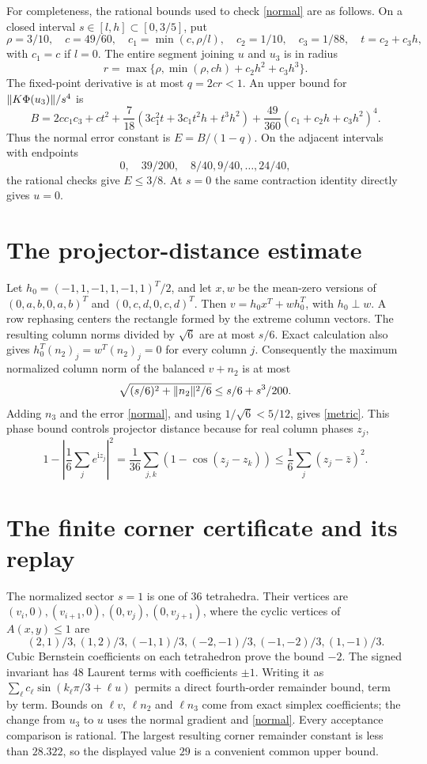 \documentclass[11pt]{article}
\newcommand{\ii}{\mathrm i}\newcommand{\perm}{\operatorname{perm}}
\begin{document}
For completeness, the rational bounds used to check \eqref{normal} are
as follows. On a closed interval $s\in[l,h]\subset[0,3/5]$, put
\[
 \rho=3/10,\quad c=49/60,\quad c_1=\min(c,\rho/l),\quad
 c_2=1/10,\quad c_3=1/88,\quad t=c_2+c_3h,
\]
with $c_1=c$ if $l=0$. The entire segment joining $u$ and $u_3$ is in radius
\[
 r=\max\{\rho,\min(\rho,ch)+c_2h^2+c_3h^3\}.
\]
The fixed-point derivative is at most $q=2cr<1$. An upper bound for
$\lVert K\Phi(u_3)\rVert/s^4$ is
\[
 B=2cc_1c_3+ct^2+\frac7{18}(3c_1^2t+3c_1t^2h+t^3h^2)
       +\frac{49}{360}(c_1+c_2h+c_3h^2)^4.
\]
Thus the normal error constant is $E=B/(1-q)$. On the adjacent intervals
with endpoints
\[
 0,\quad39/200,\quad8/40,9/40,\ldots,24/40,
\]
the rational checks give $E\le3/8$. At $s=0$ the same contraction
identity directly gives $u=0$.

\section*{The projector-distance estimate}
Let $h_0=(-1,1,-1,1,-1,1)^T/2$, and let $x,w$ be the mean-zero versions
of $(0,a,b,0,a,b)^T$ and $(0,c,d,0,c,d)^T$. Then
$v=h_0x^T+wh_0^T$, with $h_0\perp w$.
A row rephasing centers the rectangle formed by the extreme column vectors.
The resulting column norms divided by $\sqrt6$ are at most $s/6$.
Exact calculation also gives
$h_0^T(n_2)_j=w^T(n_2)_j=0$ for every column $j$.
Consequently the maximum normalized column norm of the balanced $v+n_2$
is at most
\[
 \sqrt{(s/6)^2+\lVert n_2\rVert^2/6}
 \le s/6+s^3/200.
\]
Adding $n_3$ and the error \eqref{normal}, and using $1/\sqrt6<5/12$,
gives \eqref{metric}. This phase bound controls projector distance because
for real column phases $z_j$,
\[
 1-\left|\frac16\sum_j e^{\ii z_j}\right|^2
 =\frac1{36}\sum_{j,k}(1-\cos(z_j-z_k))
 \le\frac16\sum_j(z_j-\bar z)^2.
\]

\section*{The finite corner certificate and its replay}
The normalized sector $s=1$ is one of 36 tetrahedra. Their vertices are
$(v_i,0),(v_{i+1},0),(0,v_j),(0,v_{j+1})$, where the cyclic vertices of
$A(x,y)\le1$ are
\[
 (2,1)/3,(1,2)/3,(-1,1)/3,(-2,-1)/3,(-1,-2)/3,(1,-1)/3.
\]
Cubic Bernstein coefficients on each tetrahedron prove the bound $-2$.
The signed invariant has 48 Laurent terms with coefficients $\pm1$.
Writing it as $\sum_\ell c_\ell\sin(k_\ell\pi/3+\ell u)$ permits a direct
fourth-order remainder bound, term by term.
Bounds on $\ell v$, $\ell n_2$ and $\ell n_3$ come from exact simplex
coefficients; the change from $u_3$ to $u$ uses the normal gradient and
\eqref{normal}. Every acceptance comparison is rational.
The largest resulting corner remainder constant is less than $28.322$,
so the displayed value $29$ is a convenient common upper bound.
\end{document}

